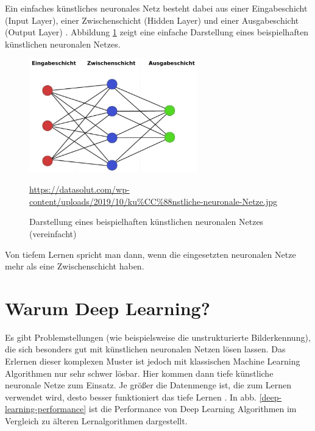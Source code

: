 \newpage

Ein einfaches künstliches neuronales Netz besteht dabei aus einer Eingabeschicht (Input Layer), einer Zwischenschicht (Hidden Layer) und einer Ausgabeschicht (Output Layer) \cite{datasolut2}. Abbildung \ref{simple-net} zeigt eine einfache Darstellung eines beispielhaften künstlichen neuronalen Netzes.

\begin{figure}[H]
	\centering
	\includegraphics[width=0.65\textwidth]{kapitel3/images/Simples_Neuronales_Netz.jpg}
	\caption{Darstellung eines beispielhaften künstlichen neuronalen Netzes \\ (vereinfacht)}
	\label{simple-net}
	\vspace{0.2cm}
	\quelle\url{https://datasolut.com/wp-content/uploads/2019/10/ku%CC%88nstliche-neuronale-Netze.jpg}
\end{figure}

Von tiefem Lernen spricht man dann, wenn die eingesetzten neuronalen Netze mehr als eine Zwischenschicht haben.  \cite{datasolut2} 

\section{Warum Deep Learning?}

Es gibt Problemstellungen (wie beispielsweise die unstrukturierte Bilderkennung), die sich besonders gut mit künstlichen neuronalen Netzen lösen lassen. Das Erlernen dieser komplexen Muster ist jedoch mit klassischen Machine Learning Algorithmen nur sehr schwer lösbar. Hier kommen dann tiefe künstliche neuronale Netze zum Einsatz. Je größer die Datenmenge ist, die zum Lernen verwendet wird, desto besser funktioniert das tiefe Lernen \cite{datasolut2}. In \acs{abb.} \ref{deep-learning-performance} ist die Performance von Deep Learning Algorithmen im Vergleich zu älteren Lernalgorithmen dargestellt.


